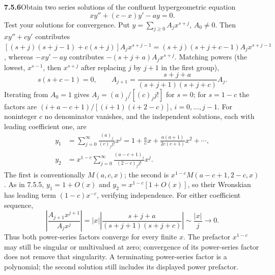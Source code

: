 \par\bigskip
\noindent\textbf{7.5.6}\quad Obtain two series solutions of the confluent
hypergeometric equation
\[
xy''+(c-x)y'-ay=0.
\]
Test your solutions for convergence.
\solution
Put $y=\sum_{j\ge0}A_jx^{s+j}$, $A_0\ne0$. Then
$x y''+c y'$ contributes
$[(s+j)(s+j-1)+c(s+j)]A_jx^{s+j-1}=(s+j)(s+j+c-1)A_jx^{s+j-1}$,
whereas $-xy'-ay$ contributes $-(s+j+a)A_jx^{s+j}$. Matching powers
(the lowest, $x^{s-1}$, then $x^{s+j}$ after replacing $j$ by $j+1$ in
the first group),
\[
s(s+c-1)=0,\qquad
\boxed{A_{j+1}=\frac{s+j+a}{(s+j+1)(s+j+c)}A_j}.
\]
Iterating from $A_0=1$ gives $A_j=(a)_j/[(c)_jj!]$ for $s=0$; for
$s=1-c$ the factors are $(i+a-c+1)/[(i+1)(i+2-c)]$, $i=0,\ldots,j-1$.
For noninteger $c$ no denominator vanishes, and the independent
solutions, each with leading coefficient one, are
\begin{align*}
y_1&=\sum_{j=0}^\infty\frac{(a)_j}{(c)_j j!}x^j
=1+\frac acx+\frac{a(a+1)}{2c(c+1)}x^2+\cdots,\\
y_2&=x^{1-c}\sum_{j=0}^\infty
\frac{(a-c+1)_j}{(2-c)_j j!}x^j.
\end{align*}
The first is conventionally $M(a,c,x)$; the second is
$x^{1-c}M(a-c+1,2-c,x)$. As in 7.5.5, $y_1=1+O(x)$ and
$y_2=x^{1-c}[1+O(x)]$, so their Wronskian has leading term
$(1-c)x^{-c}$, verifying independence.
For either coefficient sequence,
\[
\left|\frac{A_{j+1}x^{j+1}}{A_jx^j}\right|
=|x|\left|\frac{s+j+a}{(s+j+1)(s+j+c)}\right|
\sim\frac{|x|}{j}\longrightarrow0.
\]
Thus both power-series factors converge for every finite $x$.
The prefactor $x^{1-c}$ may still be singular or multivalued at zero;
convergence of its power-series factor does not remove that singularity.
A terminating power-series factor is a polynomial; the second solution
still includes its displayed power prefactor.

